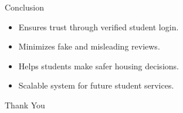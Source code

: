 \documentclass[10pt]{beamer}
\begin{document}
\begin{frame}{\faFlagCheckered \;\; Conclusion}
\begin{itemize}
    \item[\faLock] Ensures trust through verified student login.
    \item[\faCheckCircle] Minimizes fake and misleading reviews.
    \item[\faLineChart] Helps students make safer housing decisions.
    \item[\faRocket] Scalable system for future student services.
\end{itemize}
\centering
\vspace{0.3cm}
\textcolor{cyan!70}{\Large \faThumbsUp \;\; Thank You}

\end{frame}
\end{document}
